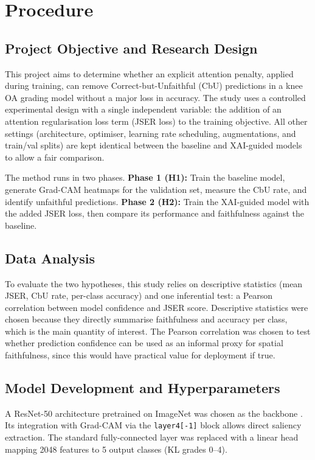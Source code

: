 \documentclass[conference]{IEEEtran}
\begin{document}
\section{Procedure}
\label{sec:procedure}

\subsection{Project Objective and Research Design}
This project aims to determine whether an explicit attention penalty, applied during training, can remove Correct-but-Unfaithful (CbU) predictions in a knee OA grading model without a major loss in accuracy. The study uses a controlled experimental design with a single independent variable: the addition of an attention regularisation loss term (JSER loss) to the training objective. All other settings (architecture, optimiser, learning rate scheduling, augmentations, and train/val splits) are kept identical between the baseline and XAI-guided models to allow a fair comparison.

The method runs in two phases. \textbf{Phase 1 (H1):} Train the baseline model, generate Grad-CAM heatmaps for the validation set, measure the CbU rate, and identify unfaithful predictions. \textbf{Phase 2 (H2):} Train the XAI-guided model with the added JSER loss, then compare its performance and faithfulness against the baseline.

\subsection{Data Analysis}
To evaluate the two hypotheses, this study relies on descriptive statistics (mean JSER, CbU rate, per-class accuracy) and one inferential test: a Pearson correlation between model confidence and JSER score. Descriptive statistics were chosen because they directly summarise faithfulness and accuracy per class, which is the main quantity of interest. The Pearson correlation was chosen to test whether prediction confidence can be used as an informal proxy for spatial faithfulness, since this would have practical value for deployment if true.

\subsection{Model Development and Hyperparameters}
A ResNet-50 architecture pretrained on ImageNet \cite{he2016} was chosen as the backbone \cite{solak2024}. Its integration with Grad-CAM via the \texttt{layer4[-1]} block allows direct saliency extraction. The standard fully-connected layer was replaced with a linear head mapping 2048 features to 5 output classes (KL grades 0--4).
\end{document}

